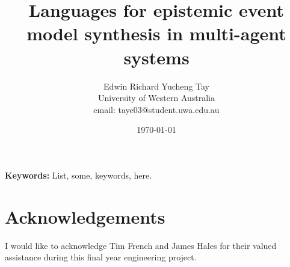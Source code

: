 \documentclass[12pt, a4paper, titlepage]{article}
\title{Languages for epistemic event model synthesis in multi-agent systems}
\author{Edwin Richard Yucheng Tay \\
University of Western Australia \\
email: taye03@student.uwa.edu.au }
\date{\today}
\numberwithin{equation}{section}
\begin{document}
\maketitle

\begin{abstract}


\end{abstract}

{\bf Keywords:} List, some, keywords, here.

\pagebreak

\tableofcontents







\section*{Acknowledgements}

I would like to acknowledge Tim French and James Hales for their valued assistance during this final
year engineering project.




\end{document}
